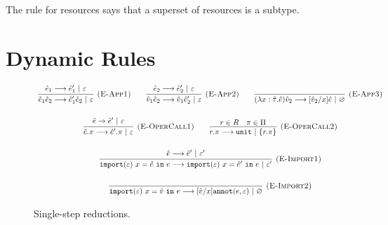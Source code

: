 The rule for resources says that a superset of resources is a subtype.













\section{Dynamic Rules}

\begin{figure}[h]

\noindent
{}

\[
\begin{array}{c}

\infer[\textsc{(E-App1)}]
	{\hat e_1 \hat e_2 \longrightarrow \hat e_1' \hat e_2~|~\varepsilon}
	{\hat e_1 \longrightarrow \hat e_1'~|~\varepsilon}
	~~~~~~
\infer[\textsc{(E-App2)}]
	{\hat v_1 \hat e_2 \longrightarrow \hat v_1 \hat e_2'~|~\varepsilon} 
	{\hat e_2 \longrightarrow \hat e_2'~|~\varepsilon}
~~~~~~
\infer[\textsc{(E-App3)}]
	{ (\lambda x: \hat \tau.\hat e) \hat v_2 \longrightarrow [\hat v_2/x]\hat e~|~\varnothing }
	{}\\[4ex]
	
\infer[\textsc{(E-OperCall1)}]
	{\hat e.\pi \longrightarrow \hat e'.\pi~|~\varepsilon }
	{\hat e \rightarrow \hat e'~|~\varepsilon}
		
	~~~~~~
	
\infer[\textsc{(E-OperCall2)}]
	{r.\pi \longrightarrow \kwa{unit}~|~\{ r.\pi \} }
	{r \in R & \pi \in \Pi}
	 \\[4ex]
	 
\infer[\textsc{(E-Import1)}]
	{\kwa{import}(\varepsilon)~x = \hat e~\kw{in} e \longrightarrow \kwa{import}(\varepsilon)~x = \hat e'~\kw{in} e~|~\varepsilon'}
	{\hat e \longrightarrow \hat e'~|~\varepsilon'}\\[4ex]

\infer[\textsc{(E-Import2)}]
	{\kwa{import}(\varepsilon)~x = \hat v~\kw{in} e \longrightarrow [\hat v/x]\kwa{annot}(e, \varepsilon)~|~\varnothing}
	{}

\end{array}
\]


\vspace{-7pt}
\caption{Single-step reductions.}
\label{This is the label.}
\end{figure}

